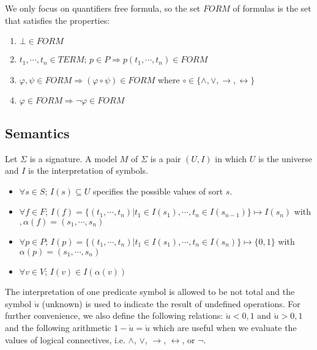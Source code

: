 \begin{definition}
We only focus on quantifiers free formula, so the set $FORM$ of formulas is the set that satisfies the properties:
\begin{enumerate}
\item $\bot \in FORM$
\item $t_1,\cdots,t_n \in TERM$; $p \in P \Rightarrow p(t_1,\cdots, t_n) \in FORM$
\item $\varphi, \psi \in FORM \Rightarrow (\varphi \circ \psi) \in FORM$ where $\circ \in \{\wedge, \vee, \rightarrow, \leftrightarrow\}$
\item $\varphi \in FORM \Rightarrow \neg\varphi \in FORM$
\end{enumerate}
\end{definition}

\subsection{Semantics}

\begin{definition}
Let $\Sigma$ is a signature. A model $M$ of $\Sigma$ is a pair $(U, I)$ in which $U$ is the universe and $I$ is the interpretation of symbols.
\begin{itemize}
\item $\forall s \in S$; $I(s) \subseteq U$ specifies the possible values of sort $s$.
\item $\forall f \in F$; $I(f) = \{(t_1,\cdots, t_n)| t_1 \in I(s_1),\cdots, t_n \in I(s_{n-1})\} \mapsto I(s_n)$ with $, \alpha(f) = (s_1,\cdots, s_n)$
\item $\forall p \in P$; $I(p) = \{(t_1,\cdots, t_n)| t_1 \in I(s_1),\cdots, t_n \in I(s_n)\} \mapsto \{0, 1\}$ with $\alpha(p) = (s_1,\cdots, s_n)$
\item $\forall v \in V$; $I(v) \in I(\alpha(v))$
\end{itemize}
\end{definition}

The interpretation of one predicate symbol is allowed to be not total and the symbol $\mathring{u}$ (unknown) is used to indicate the result of undefined operations. For further convenience, we also define the following relations: $\mathring{u} < 0, 1$ and $\mathring{u} > 0, 1$ and the following arithmetic $1 - \mathring{u} = \mathring{u}$ which are useful when we evaluate the values of logical connectives, i.e. $\wedge$, $\vee$, $\rightarrow$, $\leftrightarrow$, or $\neg$. 

